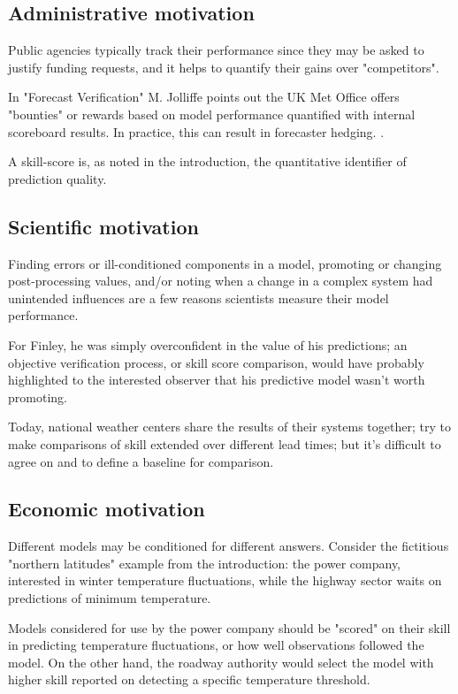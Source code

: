 \documentclass[logos,parttoc,morelanguage=french,morelanguage=german]{orsay-memoire}
\begin{document}
\subsection{Administrative motivation}
Public agencies typically track their performance since they may be asked to justify funding requests, and it helps to quantify their gains over "competitors".

In "Forecast Verification" M. Jolliffe points out the UK Met Office offers "bounties" or rewards based on model performance quantified with internal scoreboard results. In practice, this can result in forecaster hedging.
\autocite{JolliffeIanT.andStephenson2012ForecastVerification}. 

A \gls{skill-score} is, as noted in the introduction, the quantitative identifier of prediction quality.

\subsection{Scientific motivation}

Finding errors or ill-conditioned components in a model, promoting or changing post-processing values, and/or noting when a change in a complex system had unintended influences are a few reasons scientists measure their model performance.

For Finley, he was simply overconfident in the value of his predictions; an objective verification process, or skill score comparison, would have probably highlighted to the interested observer that his predictive model wasn't worth promoting. 

Today, national weather centers share the results of their systems together; try to make comparisons of skill extended over different lead times; but it's difficult to agree on and to define a baseline for comparison.

\subsection{Economic motivation}

Different models may be conditioned for different answers. Consider the fictitious "northern latitudes" example from the introduction: the power company, interested in winter temperature fluctuations, while the highway sector waits on predictions of minimum temperature.

Models considered for use by the power company should be "scored" on their skill in predicting temperature fluctuations, or how well observations followed the model. On the other hand, the roadway authority would select the model with higher skill reported on detecting a specific temperature threshold.
\end{document}
